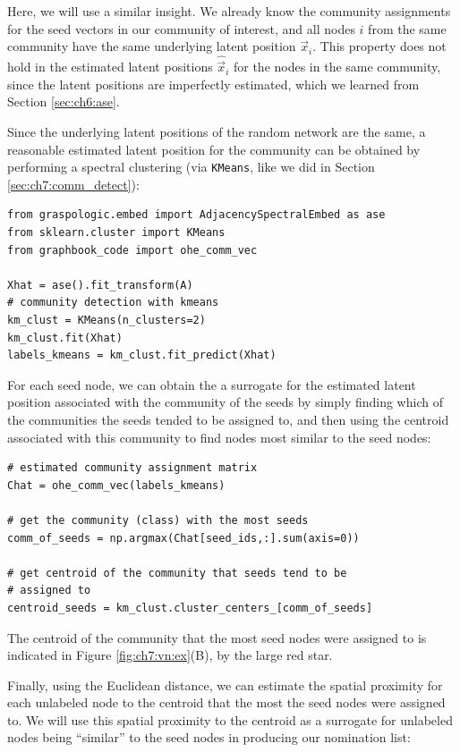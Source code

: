 Here, we will use a similar insight. We already know the community assignments for the seed vectors in our community of interest, and all nodes $i$ from the same community have the same underlying latent position $\vec x_i$. This property does not hold in the estimated latent positions $\hat{\vec x}_i$ for the nodes in the same community, since the latent positions are imperfectly estimated, which we learned from Section \ref{sec:ch6:ase}.

Since the underlying latent positions of the random network are the same, a reasonable estimated latent position for the community can be obtained by performing a spectral clustering (via \texttt{KMeans}, like we did in Section \ref{sec:ch7:comm_detect}):

\begin{lstlisting}[style=python]
from graspologic.embed import AdjacencySpectralEmbed as ase
from sklearn.cluster import KMeans
from graphbook_code import ohe_comm_vec

Xhat = ase().fit_transform(A)
# community detection with kmeans
km_clust = KMeans(n_clusters=2)
km_clust.fit(Xhat)
labels_kmeans = km_clust.fit_predict(Xhat)
\end{lstlisting}

For each seed node, we can obtain the a surrogate for the estimated latent position associated with the community of the seeds by simply finding which of the communities the seeds tended to be assigned to, and then using the centroid associated with this community to find nodes most similar to the seed nodes:

\begin{lstlisting}[style=python]
# estimated community assignment matrix
Chat = ohe_comm_vec(labels_kmeans)

# get the community (class) with the most seeds
comm_of_seeds = np.argmax(Chat[seed_ids,:].sum(axis=0))

# get centroid of the community that seeds tend to be
# assigned to
centroid_seeds = km_clust.cluster_centers_[comm_of_seeds]
\end{lstlisting}

The centroid of the community that the most seed nodes were assigned to is indicated in Figure \ref{fig:ch7:vn:ex}(B), by the large red star. 

Finally, using the Euclidean distance, we can estimate the spatial proximity for each unlabeled node to the centroid that the most the seed nodes were assigned to. We will use this spatial proximity to the centroid as a surrogate for unlabeled nodes being ``similar'' to the seed nodes in producing our nomination list:

